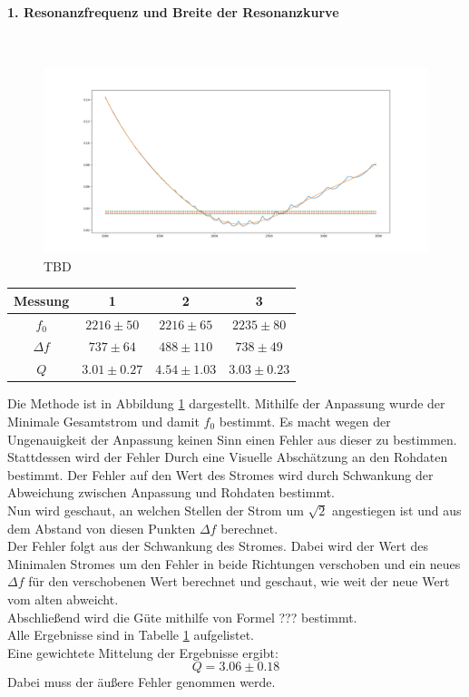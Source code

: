 \documentclass[12pt,a4paper]{article}
\begin{document}
\paragraph{1. Resonanzfrequenz und Breite der Resonanzkurve}\mbox{}\\
\begin{figure}
\centering
\includegraphics[scale=0.4]{Bilder/Parallel_Iges.png}
\caption{TBD}
\label{fig:parallel_Iges}
\end{figure}

\begin{table}
\begin{tabular}{|c|c|c|c|}
\hline
Messung & 1&2&3\\
\hline
$f_0$ & $2216\pm 50 $ & $2216\pm 65 $ & $2235\pm 80$\\
\hline
$\Delta f$ & $737\pm 64 $ & $488\pm 110 $ & $738\pm 49$\\
\hline
$Q$ & $3.01\pm 0.27 $ & $4.54\pm 1.03 $ & $3.03\pm 0.23$\\
\hline
\end{tabular}
\label{tab:parallel_methode1}
\end{table}

Die Methode ist in Abbildung \ref{fig:parallel_Iges} dargestellt.
Mithilfe der Anpassung wurde der Minimale Gesamtstrom und damit $f_0$ bestimmt. Es macht wegen der Ungenauigkeit der Anpassung keinen Sinn einen Fehler aus dieser zu bestimmen.  Stattdessen wird der Fehler Durch eine Visuelle Abschätzung an den Rohdaten bestimmt.
Der Fehler auf den Wert des Stromes wird durch Schwankung der Abweichung zwischen Anpassung und Rohdaten bestimmt.\\
Nun wird geschaut, an welchen Stellen der Strom um $\sqrt{2}$ angestiegen ist und aus dem Abstand von diesen Punkten $\Delta f$ berechnet.\\
Der Fehler folgt aus der Schwankung des Stromes. Dabei wird der Wert des Minimalen Stromes um den Fehler in beide Richtungen verschoben und ein neues $\Delta f$ für den verschobenen Wert berechnet und geschaut, wie weit der neue Wert vom alten abweicht.\\
Abschließend wird die Güte mithilfe von Formel ??? bestimmt.\\
Alle Ergebnisse sind in Tabelle \ref{tab:parallel_methode1} aufgelistet.\\
Eine gewichtete Mittelung der Ergebnisse ergibt:
\begin{equation}
Q = 3.06\pm 0.18 
\end{equation}
Dabei muss der äußere Fehler genommen werde.
\end{document}
